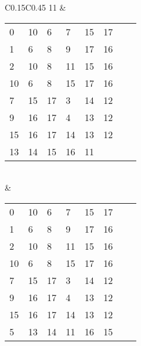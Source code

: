 \begin{longtable}{C{0.15\textwidth}C{0.45\textwidth}}
11 & 
\begin{tabular}{p{}p{}p{}p{}p{}p{}p{}p{}}
0 & 10 & 6 & 7 & 15 & 17 &  & \\
1 & 6 & 8 & 9 & 17 & 16 &  & \\
2 & 10 & 8 & 11 & 15 & 16 &  & \\
10 & 6 & 8 & 15 & 17 & 16 &  & \\
7 & 15 & 17 & 3 & 14 & 12 &  & \\
9 & 16 & 17 & 4 & 13 & 12 &  & \\
15 & 16 & 17 & 14 & 13 & 12 &  & \\
13 & 14 & 15 & 16 & 11 &  &  & \\
\end{tabular}
\\ & 
\begin{tabular}{p{}p{}p{}p{}p{}p{}p{}p{}}
0 & 10 & 6 & 7 & 15 & 17 &  & \\
1 & 6 & 8 & 9 & 17 & 16 &  & \\
2 & 10 & 8 & 11 & 15 & 16 &  & \\
10 & 6 & 8 & 15 & 17 & 16 &  & \\
7 & 15 & 17 & 3 & 14 & 12 &  & \\
9 & 16 & 17 & 4 & 13 & 12 &  & \\
15 & 16 & 17 & 14 & 13 & 12 &  & \\
5 & 13 & 14 & 11 & 16 & 15 &  & \\
\end{tabular}
  \end{longtable}
\endgroup